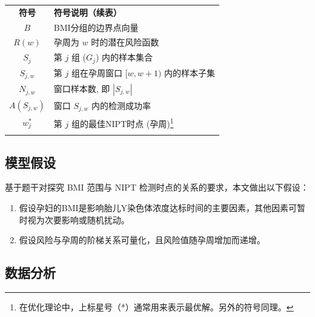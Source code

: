 \begin{center}
    \begin{tabularx}{0.8\textwidth}{c@{\hspace{1pc}}|@{\hspace{2pc}}>{\centering\arraybackslash}X}
        \Xhline{0.08em} %
        \textbf{符号}  & \textbf{符号说明（续表）}                                                \\
        \Xhline{0.05em}
        $B$          & BMI分组的边界点向量                                                      \\
        $R(w)$       & 孕周为 $w$ 时的潜在风险函数                                                 \\
        $S_j$        & 第 $j$ 组 ($G_j$) 内的样本集合                                           \\
        $S_{j,w}$    & 第 $j$ 组在孕周窗口 $[w, w+1)$ 内的样本子集                                   \\
        $N_{j,w}$    & 窗口样本数, 即 $|S_{j,w}|$                                             \\
        $A(S_{j,w})$ & 窗口 $S_{j,w}$ 内的检测成功率                                             \\
        $w_j^*$      & 第 $j$ 组的最佳NIPT时点 (孕周)\footnote{在优化理论中，上标星号（*）通常用来表示最优解。另外的符号同理。} \\
        \Xhline{0.08em}
    \end{tabularx}
\end{center}

\subsection{模型假设}

基于题干对探究 BMI 范围与 NIPT 检测时点的关系的要求，本文做出以下假设：

\begin{enumerate}
    \item 假设孕妇的BMI是影响胎儿Y染色体浓度达标时间的主要因素，其他因素可暂时视为次要影响或随机扰动。
    \item 假设风险与孕周的阶梯关系可量化，且风险值随孕周增加而递增。
\end{enumerate}

\subsection{数据分析}

